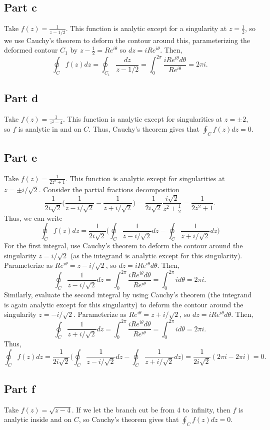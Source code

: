 \documentclass{article}
\begin{document}
\subsection{Part c}
Take $f(z)=\frac{1}{z-1/2}$. This function is analytic except for a singularity at $z=\frac{1}{2}$, so we use Cauchy's theorem to deform the contour around this, parameterizing the deformed contour $C_1$ by $z-\frac{1}{2}=Re^{i\theta}$ so $dz=iRe^{i\theta}$. Then,
\[
\oint_C f(z)dz=\oint_{C_1} \frac{dz}{z-1/2}=\int_0^{2\pi}\frac{iRe^{i\theta}d\theta}{Re^{i\theta}}=2\pi i.
\]
\subsection{Part d}
Take $f(z)=\frac{1}{z^2-4}$. This function is analytic except for singularities at $z=\pm2$, so $f$ is analytic in and on $C$. Thus, Cauchy's theorem gives that $\oint_C f(z)dz=0$.
\subsection{Part e}
Take $f(z)=\frac{1}{2z^2+1}$. This function is analytic except for singularities at $z=\pm i/\sqrt{2}$. Consider the partial fractions decomposition 
\[
\frac{1}{2i\sqrt2}\bigg(\frac{1}{z-i/\sqrt{2}}-\frac{1}{z+i/\sqrt{2}}\bigg)=\frac{1}{2i\sqrt2}\frac{i\sqrt{2}}{z^2+\frac{1}{2}}=\frac{1}{2z^2+1}.
\]
Thus, we can write
\[
\oint_C f(z)dz=\frac{1}{2i\sqrt2}\bigg(\oint_C\frac{1}{z-i/\sqrt{2}}dz-\oint_C\frac{1}{z+i/\sqrt{2}}dz\bigg)
\]
For the first integral, use Cauchy's theorem to deform the contour around the singularity $z=i/\sqrt{2}$ (as the integrand is analytic except for this singularity). Parameterize as $Re^{i\theta}=z-i/\sqrt{2}$, so $dz=iRe^{i\theta}d\theta$. Then,
\[
\oint_C\frac{1}{z-i/\sqrt{2}}dz=\int_0^{2\pi}\frac{iRe^{i\theta}d\theta}{Re^{i\theta}}=\int_0^{2\pi}id\theta=2\pi i.
\]
Similarly, evaluate the second integral by using Cauchy's theorem (the integrand is again analytic except for this singularity) to deform the contour around the singularity $z=-i/\sqrt{2}$. Parameterize as $Re^{i\theta}=z+i/\sqrt{2}$, so $dz=iRe^{i\theta}d\theta$. Then,
\[
\oint_C\frac{1}{z+i/\sqrt{2}}dz=\int_0^{2\pi}\frac{iRe^{i\theta}d\theta}{Re^{i\theta}}=\int_0^{2\pi}id\theta=2\pi i.
\]
Thus,
\[
\oint_C f(z)dz=\frac{1}{2i\sqrt2}\bigg(\oint_C\frac{1}{z-i/\sqrt{2}}dz-\oint_C\frac{1}{z+i/\sqrt{2}}dz\bigg)=\frac{1}{2i\sqrt2}(2\pi i-2\pi i)=0.
\]
\subsection{Part f}
Take $f(z)=\sqrt{z-4}$. If we let the branch cut be from 4 to infinity, then $f$ is analytic inside and on $C$, so Cauchy's theorem gives that $\oint_C f(z)dz=0$.
\end{document}
